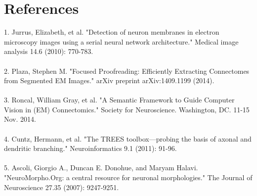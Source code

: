 \documentclass[11pt]{article} %
\begin{document}
\section{References}
1. Jurrus, Elizabeth, et al. "Detection of neuron membranes in electron microscopy images using a serial neural network architecture." Medical image analysis 14.6 (2010): 770-783.\\
\\
2. Plaza, Stephen M. "Focused Proofreading: Efficiently Extracting Connectomes from Segmented EM Images." arXiv preprint arXiv:1409.1199 (2014).\\
\\
3. Roncal, William Gray, et al. "A Semantic Framework to Guide Computer Vision in (EM) Connectomics." Society for Neuroscience. Washington, DC. 11-15 Nov. 2014.\\
\\
4. Cuntz, Hermann, et al. "The TREES toolbox—probing the basis of axonal and dendritic branching." Neuroinformatics 9.1 (2011): 91-96.\\
\\
5. Ascoli, Giorgio A., Duncan E. Donohue, and Maryam Halavi. "NeuroMorpho.Org: a central resource for neuronal morphologies." The Journal of Neuroscience 27.35 (2007): 9247-9251.\\
\end{document}
